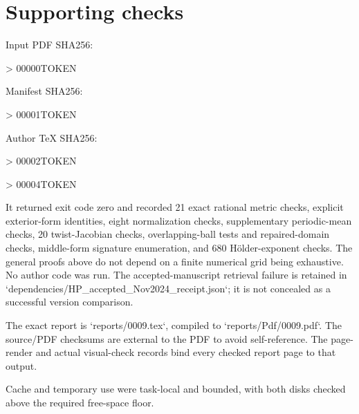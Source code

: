 \documentclass[10pt]{article}
\begin{document}
\section*{Supporting checks}
Input PDF SHA256:\par
> 00000TOKEN\par
Manifest SHA256:\par
> 00001TOKEN\par
Author TeX SHA256:\par
> 00002TOKEN\par
> 00004TOKEN\par
It returned exit code zero and recorded 21 exact rational metric checks, explicit exterior-form identities, eight normalization checks, supplementary periodic-mean checks, 20 twist-Jacobian checks, overlapping-ball tests and repaired-domain checks, middle-form signature enumeration, and 680 Hölder-exponent checks. The general proofs above do not depend on a finite numerical grid being exhaustive. No author code was run. The accepted-manuscript retrieval failure is retained in `dependencies/HP\_accepted\_Nov2024\_receipt.json`; it is not concealed as a successful version comparison.\par
The exact report is `reports/0009.tex`, compiled to `reports/Pdf/0009.pdf`. The source/PDF checksums are external to the PDF to avoid self-reference. The page-render and actual visual-check records bind every checked report page to that output.\par
Cache and temporary use were task-local and bounded, with both disks checked above the required free-space floor.\par
\end{document}
